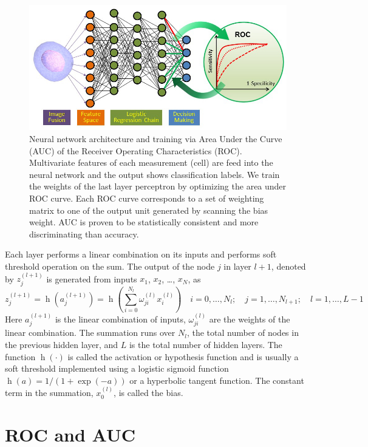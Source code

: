\documentclass[aps,pra,preprint,superscriptaddress]{revtex4-1}
\DeclareMathOperator{\h}{h} %
\begin{document}
\begin{figure}
\includegraphics[scale=0.55]{FigureNeuralNet.jpg}
\caption{\label{fig:NeuralNet} Neural network architecture and training via Area Under the Curve (AUC) of the Receiver Operating Characteristics (ROC). Multivariate features of each measurement (cell) are feed into the neural network and the output shows classification labels. We train the weights of the last layer perceptron by optimizing the area under ROC curve. Each ROC curve corresponds to a set of weighting matrix to one of the output unit generated by scanning the bias weight. AUC is proven to be statistically consistent and more discriminating than accuracy.}
\end{figure}


Each layer performs a linear combination on its inputs and performs soft threshold operation on the sum. The output of the node $j$ in layer $l+1$, denoted by $z_j^{(l+1)}$ is generated from inputs $x_1$, $x_2$, \ldots, $x_N$, as
\begin{equation}
z_j^{(l+1)} = \h(a_j^{(l+1)}) = \h(\sum_{i=0}^{N_l} \omega_{ji}^{(l)} x_i^{(l)})\quad i =0,\dotsc,N_l;\quad j=1,\dotsc,N_{l+1};\quad l=1,\dotsc,L-1
\end{equation}
Here $a_j^{(l+1)}$ is the linear combination of inputs, $\omega_{ji}^{(l)}$ are the weights of the linear combination. The summation runs over $N_l$, the total number of nodes in the previous hidden layer, and $L$ is the total number of hidden layers. The function $\h(\cdot)$ is called the activation or hypothesis function and is usually a soft threshold implemented using a logistic sigmoid function $\h(a)=1/(1+\exp⁡(-a))$ or a hyperbolic tangent function. The constant term in the summation, $x_0^{(l)}$, is called the bias.

\section{ROC and AUC}
\end{document}
